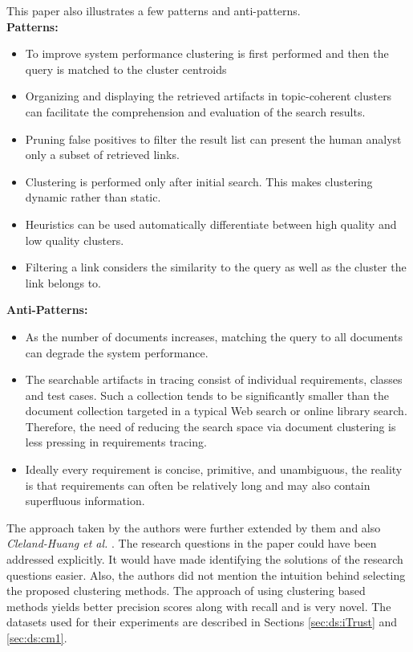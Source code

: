 \documentclass{report}
\begin{document}
This paper also illustrates a few patterns and anti-patterns.\\
\textbf{Patterns:}

\begin{itemize}
\item To improve system performance clustering is first performed and then the query is matched to the
cluster centroids
\item Organizing and displaying the retrieved artifacts in topic-coherent clusters can facilitate the
comprehension and evaluation of the search results.
\item Pruning false positives to filter the result list can present the human analyst only a subset of
retrieved links.
\item Clustering is performed only after initial search. This makes clustering dynamic rather than static.
\item Heuristics can be used automatically differentiate between high quality and low quality clusters.
\item Filtering a link considers the similarity to the query as well as the cluster the link belongs to.
\end{itemize}

\textbf{Anti-Patterns:}

\begin{itemize}
\item As the number of documents increases, matching the query to all documents can degrade the system
performance.
\item The searchable artifacts in tracing consist of individual requirements, classes and test cases. Such
a collection tends to be significantly smaller than the document collection targeted in a typical Web
search or online library search. Therefore, the need of reducing the search space via document clustering
is less pressing in requirements tracing.
\item Ideally every requirement is concise, primitive, and unambiguous, the reality is that requirements 
can often be relatively long and may also contain superfluous information.
\end{itemize}

The approach taken by the authors were further extended by them \cite{niu13} and also
\textit{Cleland-Huang et al.} \cite{clelandHuang14}. The research questions in the paper could have been
addressed explicitly. It would have made identifying the solutions of the research questions easier. Also,
the authors did not mention the intuition behind selecting the proposed clustering methods. The approach
of using clustering based methods yields better precision scores along with recall and is very novel. The
datasets used for their experiments are described in Sections \ref{sec:ds:iTrust} and \ref{sec:ds:cm1}.
\end{document}
